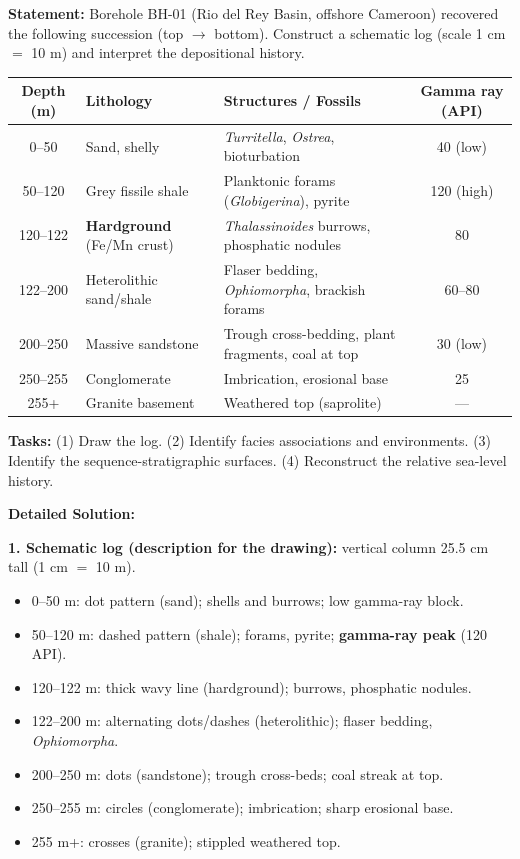 \documentclass[11pt]{article}
\begin{document}
\begin{exoresolu}
\textbf{Statement:} Borehole BH-01 (Rio del Rey Basin, offshore Cameroon) recovered the following succession (top $\rightarrow$ bottom). Construct a schematic log (scale 1 cm $=$ 10 m) and interpret the depositional history.

\begin{center}
\begin{tabular}{|c|l|l|c|}\hline
\rowcolor{popblueL}\textbf{Depth (m)} & \textbf{Lithology} & \textbf{Structures / Fossils} & \textbf{Gamma ray (API)} \\ \hline
0--50 & Sand, shelly & \emph{Turritella}, \emph{Ostrea}, bioturbation & 40 (low) \\ \hline
50--120 & Grey fissile shale & Planktonic forams (\emph{Globigerina}), pyrite & 120 (high) \\ \hline
120--122 & \textbf{Hardground} (Fe/Mn crust) & \emph{Thalassinoides} burrows, phosphatic nodules & 80 \\ \hline
122--200 & Heterolithic sand/shale & Flaser bedding, \emph{Ophiomorpha}, brackish forams & 60--80 \\ \hline
200--250 & Massive sandstone & Trough cross-bedding, plant fragments, coal at top & 30 (low) \\ \hline
250--255 & Conglomerate & Imbrication, erosional base & 25 \\ \hline
255+ & Granite basement & Weathered top (saprolite) & --- \\ \hline
\end{tabular}
\end{center}

\textbf{Tasks:} (1) Draw the log. (2) Identify facies associations and environments. (3) Identify the sequence-stratigraphic surfaces. (4) Reconstruct the relative sea-level history.

\tcblower
\textbf{Detailed Solution:}

\textbf{1. Schematic log (description for the drawing):} vertical column 25.5 cm tall (1 cm $=$ 10 m).
\begin{itemize}
    \item 0--50 m: dot pattern (sand); shells and burrows; low gamma-ray block.
    \item 50--120 m: dashed pattern (shale); forams, pyrite; \textbf{gamma-ray peak} (120 API).
    \item 120--122 m: thick wavy line (hardground); burrows, phosphatic nodules.
    \item 122--200 m: alternating dots/dashes (heterolithic); flaser bedding, \emph{Ophiomorpha}.
    \item 200--250 m: dots (sandstone); trough cross-beds; coal streak at top.
    \item 250--255 m: circles (conglomerate); imbrication; sharp erosional base.
    \item 255 m+: crosses (granite); stippled weathered top.
\end{itemize}


\end{exoresolu}
\end{document}
